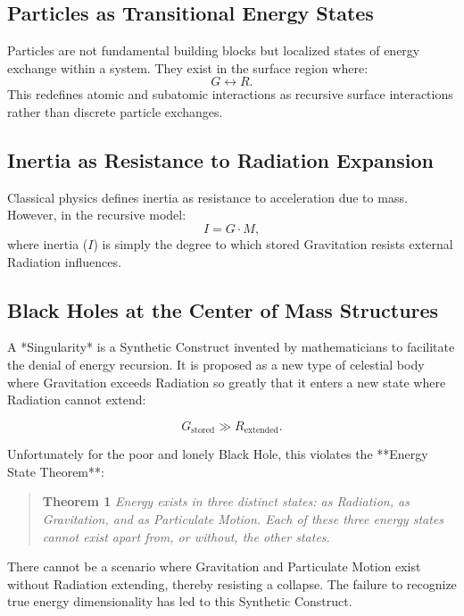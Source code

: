 \documentclass{article}
\begin{document}
\subsection{Particles as Transitional Energy States}
Particles are not fundamental building blocks but localized states of energy exchange within a system. They exist in the surface region where:
\begin{equation}
    G \leftrightarrow R.
\end{equation}
This redefines atomic and subatomic interactions as recursive surface interactions rather than discrete particle exchanges.

\subsection{Inertia as Resistance to Radiation Expansion}
Classical physics defines inertia as resistance to acceleration due to mass. However, in the recursive model:
\begin{equation}
    I = G \cdot M,
\end{equation}
where inertia ($I$) is simply the degree to which stored Gravitation resists external Radiation influences.

\subsection{Black Holes at the Center of Mass Structures}

A *Singularity* is a Synthetic Construct invented by mathematicians to facilitate the denial of energy recursion. It is proposed as a new type of celestial body where Gravitation exceeds Radiation so greatly that it enters a new state where Radiation cannot extend: 

\begin{equation}
    G_{\text{stored}} \gg R_{\text{extended}}.
\end{equation}

Unfortunately for the poor and lonely Black Hole, this violates the **Energy State Theorem**:

\begin{quote}
\textbf{Theorem 1} \textit{Energy exists in three distinct states: as Radiation, as Gravitation, and as Particulate Motion. Each of these three energy states cannot exist apart from, or without, the other states.}
\end{quote}

There cannot be a scenario where Gravitation and Particulate Motion exist without Radiation extending, thereby resisting a collapse. The failure to recognize true energy dimensionality has led to this Synthetic Construct.
\end{document}
